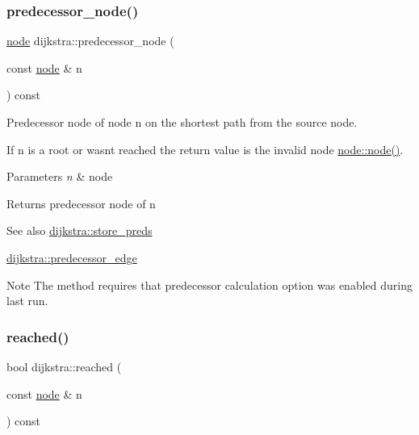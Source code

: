 \subsubsection{\texorpdfstring{predecessor\+\_\+node()}{predecessor\_node()}}
{\footnotesize\ttfamily \mbox{\hyperlink{classnode}{node}} dijkstra\+::predecessor\+\_\+node (\begin{DoxyParamCaption}\item[{const \mbox{\hyperlink{classnode}{node}} \&}]{n }\end{DoxyParamCaption}) const}



Predecessor node of node {\ttfamily n} on the shortest path from the source node. 

If {\ttfamily n} is a root or wasn\textquotesingle{}t reached the return value is the invalid node \mbox{\hyperlink{classnode_ad603259398d5667e3b97a6322a2bcc20}{node\+::node()}}.


\begin{DoxyParams}{Parameters}
{\em n} & node\\
\hline
\end{DoxyParams}
\begin{DoxyReturn}{Returns}
predecessor node of {\ttfamily n} 
\end{DoxyReturn}
\begin{DoxySeeAlso}{See also}
\mbox{\hyperlink{classdijkstra_af79383dbbb6b737afcefd8e32350192d}{dijkstra\+::store\+\_\+preds}} 

\mbox{\hyperlink{classdijkstra_aa3ef1a7d7dfc33e4a39aff309f873929}{dijkstra\+::predecessor\+\_\+edge}}
\end{DoxySeeAlso}
\begin{DoxyNote}{Note}
The method requires that predecessor calculation option was enabled during last run. 
\end{DoxyNote}
\mbox{\label{classdijkstra_a405ff80abfc9ad98668534032eed6a5b}} 
\subsubsection{\texorpdfstring{reached()}{reached()}}
{\footnotesize\ttfamily bool dijkstra\+::reached (\begin{DoxyParamCaption}\item[{const \mbox{\hyperlink{classnode}{node}} \&}]{n }\end{DoxyParamCaption}) const}



